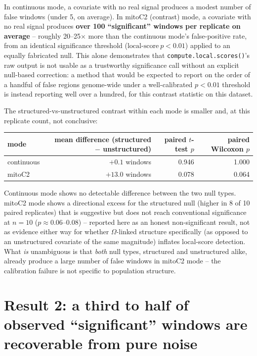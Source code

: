 \documentclass[11pt]{article}
\begin{document}
In continuous mode, a covariate with no real signal produces a modest number of false windows
(under 5, on average). In mitoC2 (contrast) mode, a covariate with no real signal produces
\textbf{over 100 ``significant'' windows per replicate on average} -- roughly 20--25$\times$ more
than the continuous mode's false-positive rate, from an identical significance threshold
($\mathrm{local\text{-}score\ } p<0.01$) applied to an equally fabricated null. This alone
demonstrates that \texttt{compute.local.scores()}'s raw output is not usable as a trustworthy
significance call without an explicit null-based correction: a method that would be expected to
report on the order of a handful of false regions genome-wide under a well-calibrated $p<0.01$
threshold is instead reporting well over a hundred, for this contrast statistic on this dataset.

The structured-vs-unstructured contrast within each mode is smaller and, at this replicate count,
not conclusive:

\begin{table}[H]
\centering\small
\begin{tabular}{lrrr}
\toprule
mode & mean difference (structured $-$ unstructured) & paired $t$-test $p$ & paired Wilcoxon $p$ \\
\midrule
continuous & $+0.1$ windows  & 0.946 & 1.000 \\
mitoC2     & $+13.0$ windows & 0.078 & 0.064 \\
\bottomrule
\end{tabular}
\end{table}

Continuous mode shows no detectable difference between the two null types. mitoC2 mode shows a
directional excess for the structured null (higher in 8 of 10 paired replicates) that is
suggestive but does not reach conventional significance at $n=10$ ($p\approx 0.06$--$0.08$) --
reported here as an honest non-significant result, not as evidence either way for whether
$\Omega$-linked structure specifically (as opposed to an unstructured covariate of the same
magnitude) inflates local-score detection. What \emph{is} unambiguous is that \emph{both} null
types, structured and unstructured alike, already produce a large number of false windows in
mitoC2 mode -- the calibration failure is not specific to population structure.

\section*{\color{Accent}Result 2: a third to half of observed ``significant'' windows are
recoverable from pure noise}
\end{document}
